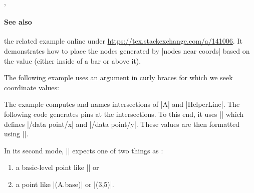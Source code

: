 \begin{commandlist}{\pgfplotspointgetcoordinates,\pgfplotspointgetcoordinates{}}
    \paragraph{See also} the related example online under
    \url{https://tex.stackexchange.com/a/141006}. It demonstrates how to
    place the nodes generated by |nodes near coords| based on the value (either
    inside of a bar or above it).

    The following example uses an argument in curly braces for which we seek
    coordinate values:
\begin{codeexample}[]
\end{codeexample}
    The example computes and names intersections of |A| and |HelperLine|. The
    following code generates pins at the intersections. To this end, it uses
    |\pgfplotspointgetcoordinates| which defines |/data point/x|
    and |/data point/y|. These values are then formatted using
    |\pgfmathprintnumber|.

    In its second mode, |\pgfplotspointgetcoordinates| expects one
    of two things as :
    \begin{enumerate}
        \item a basic-level \PGF{} point like || or
        \item a \Tikz{} point like |(A.base)| or |(3,5)|.
    \end{enumerate}
\end{commandlist}

